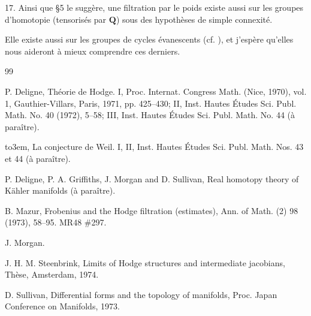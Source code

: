\documentclass{amsart}
\theoremstyle{plain}
\theoremstyle{definition}
\theoremstyle{remark}
\providecommand{\bysame}{\leavevmode\hbox to3em{\hrulefill}\thinspace}
\begin{document}
17. Ainsi que \S 5 le sugg\`ere, une filtration par le poids existe aussi sur les groupes d'homotopie (tensoris\'es par $\mathbf{Q}$) sous des hypoth\`eses de simple connexit\'e.

Elle existe aussi sur les groupes de cycles \'evanescents (cf. \cite{St}), et j'esp\`ere qu'elles nous aideront \`a mieux comprendre ces derniers.

\begin{thebibliography}{99}

 P. Deligne, Th\'eorie de Hodge. I, Proc. Internat. Congress Math. (Nice, 1970), vol. 1, Gauthier-Villars, Paris, 1971, pp. 425--430; II, Inst. Hautes \'Etudes Sci. Publ. Math. No. 40 (1972), 5--58; III, Inst. Hautes \'Etudes Sci. Publ. Math. No. 44 (\`a para\^itre).

 \bysame, La conjecture de Weil. I, II, Inst. Hautes \'Etudes Sci. Publ. Math. Nos. 43 et 44 (\`a para\^itre).

 P. Deligne, P. A. Griffiths, J. Morgan and D. Sullivan, Real homotopy theory of K\"ahler manifolds (\`a para\^itre).

 B. Mazur, Frobenius and the Hodge filtration (estimates), Ann. of Math. (2) 98 (1973), 58--95. MR48 \#297.

 J. Morgan.

 J. H. M. Steenbrink, Limits of Hodge structures and intermediate jacobians, Th\`ese, Amsterdam, 1974.

 D. Sullivan, Differential forms and the topology of manifolds, Proc. Japan Conference on Manifolds, 1973.

\end{thebibliography}
\end{document}
